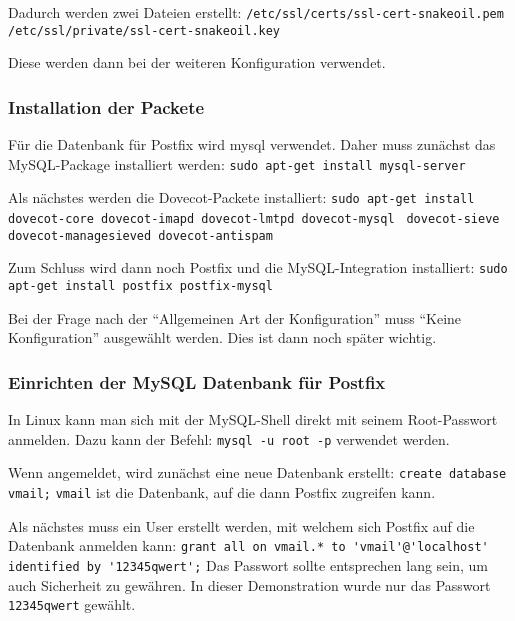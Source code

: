 Dadurch werden zwei Dateien erstellt: \newline
\verb|/etc/ssl/certs/ssl-cert-snakeoil.pem| \newline
\verb|/etc/ssl/private/ssl-cert-snakeoil.key| \newline

Diese werden dann bei der weiteren Konfiguration verwendet.

\subsubsection{Installation der Packete}


Für die Datenbank für Postfix wird mysql verwendet. Daher muss zunächst das MySQL-Package installiert werden:\newline
\verb|sudo apt-get install mysql-server|

Als nächstes werden die Dovecot-Packete installiert:\newline
\verb|sudo apt-get install dovecot-core dovecot-imapd dovecot-lmtpd dovecot-mysql |\newline
\verb|dovecot-sieve dovecot-managesieved dovecot-antispam|\newline

Zum Schluss wird dann noch Postfix und die MySQL-Integration installiert: \newline
\verb|sudo apt-get install postfix postfix-mysql|

Bei der Frage nach der ``Allgemeinen Art der Konfiguration'' muss ``Keine Konfiguration'' ausgewählt werden. Dies ist dann noch später wichtig.

\subsubsection{Einrichten der MySQL Datenbank für Postfix}
In Linux kann man sich mit der MySQL-Shell direkt mit seinem Root-Passwort anmelden. Dazu kann der Befehl:\newline
\verb|mysql -u root -p|\newline
verwendet werden.

Wenn angemeldet, wird zunächst eine neue Datenbank erstellt:\newline
\verb|create database vmail;|\newline
\verb|vmail| ist die Datenbank, auf die dann Postfix zugreifen kann.

Als nächstes muss ein User erstellt werden, mit welchem sich Postfix auf die Datenbank anmelden kann:\newline
\verb|grant all on vmail.* to 'vmail'@'localhost' identified by '12345qwert';|\newline
Das Passwort sollte entsprechen lang sein, um auch Sicherheit zu gewähren. In dieser Demonstration wurde nur das Passwort \verb|12345qwert| gewählt.

